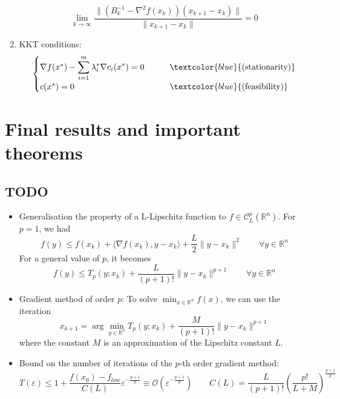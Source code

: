 \documentclass[12pt, openany]{report}
\newcommand{\R}{\mathbb{R}}
\newcommand{\C}{\mathcal{C}}
\renewcommand{\O}{\mathcal{O}}
\theoremstyle{definition}
\begin{document}
\begin{enumerate}
	\begin{equation}
		\lim_{k\to \infty} \frac{\|\left(B_k^{-1}-\nabla^2f(x_k)\right)(x_{k+1}-x_k)\|}{\|x_{k+1}-x_k\|} = 0
	\end{equation}
	\item KKT conditions:
	\begin{equation}
	\begin{cases}
		\nabla f(x^*) - \displaystyle \sum_{i=1}^m \lambda_i^* \nabla c_i(x^*) = 0  \quad \quad &\textcolor{blue}{\text{(stationarity)}}\\
		c(x^*) = 0 &\textcolor{blue}{\text{(feasibility)}}
	\end{cases}
\end{equation}
\end{enumerate}
\chapter{Final results and important theorems}
\section{TODO}
\begin{itemize}
	\item Generalisation the property of a L-Lipschitz function to $f\in \C_L^p(\R^n)$. For $p=1$, we had 
	\begin{equation}
		f(y)\le f(x_k) + \langle \nabla f(x_k),y-x_k\rangle + \frac{L}{2}\lVert y-x_k\rVert^2 \qquad \forall y\in \R^n 
	\end{equation}
	For a general value of $p$, it becomes 
	\begin{equation}
		f(y) \le T_p(y;x_k) + \frac{L}{(p+1)!}\lVert y-x_k\rVert^{p+1} \qquad \forall y\in \R^n 
	\end{equation}
	\item Gradient method of order $p$: To solve $\min_{x\in \R^n} f(x)$, we can use the iteration 
	\begin{equation}
		x_{k+1} = \arg\min_{y\in \R^n} T_p(y;x_k)+\frac{M}{(p+1)!}\lVert y-x_k\rVert^{p+1}
	\end{equation}
	where the constant $M$ is an approximation of the Lipschitz constant $L$. 
	\item Bound on the number of iterations of the $p$-th order gradient method:
	\begin{equation}
		T(\varepsilon) \le 1 + \frac{f(x_0)-f_{low}}{C(L)} \varepsilon^{-\frac{p+1}{p}} \equiv \O\left(\varepsilon^{-\frac{p+1}{p}}\right) \qquad C(L) = \frac{L}{(p+1)!}\left(\frac{p!}{L+M}\right)^{\frac{p+1}{p}}
	\end{equation} 
\end{itemize}
\end{document}
